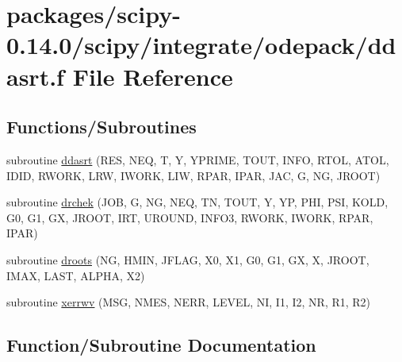 \hypertarget{ddasrt_8f}{}\section{packages/scipy-\/0.14.0/scipy/integrate/odepack/ddasrt.f File Reference}
\label{ddasrt_8f}
\subsection*{Functions/\+Subroutines}
\begin{DoxyCompactItemize}
\item 
subroutine \hyperlink{ddasrt_8f_adfc3346e603984f58f7cd11c3398bb07}{ddasrt} (R\+E\+S, N\+E\+Q, T, Y, Y\+P\+R\+I\+M\+E, T\+O\+U\+T, I\+N\+F\+O, R\+T\+O\+L, A\+T\+O\+L, I\+D\+I\+D, R\+W\+O\+R\+K, L\+R\+W, I\+W\+O\+R\+K, L\+I\+W, R\+P\+A\+R, I\+P\+A\+R, J\+A\+C, G, N\+G, J\+R\+O\+O\+T)
\item 
subroutine \hyperlink{ddasrt_8f_a4cde4bbacb0b416a894b59b0a293c7ea}{drchek} (J\+O\+B, G, N\+G, N\+E\+Q, T\+N, T\+O\+U\+T, Y, Y\+P, P\+H\+I, P\+S\+I, K\+O\+L\+D, G0, G1, G\+X, J\+R\+O\+O\+T, I\+R\+T, U\+R\+O\+U\+N\+D, I\+N\+F\+O3, R\+W\+O\+R\+K, I\+W\+O\+R\+K, R\+P\+A\+R, I\+P\+A\+R)
\item 
subroutine \hyperlink{ddasrt_8f_a143b7750ca413bfb317a54a34737d0df}{droots} (N\+G, H\+M\+I\+N, J\+F\+L\+A\+G, X0, X1, G0, G1, G\+X, X, J\+R\+O\+O\+T, I\+M\+A\+X, L\+A\+S\+T, A\+L\+P\+H\+A, X2)
\item 
subroutine \hyperlink{ddasrt_8f_a67021eb787c6039db5cee1a98e06b722}{xerrwv} (M\+S\+G, N\+M\+E\+S, N\+E\+R\+R, L\+E\+V\+E\+L, N\+I, I1, I2, N\+R, R1, R2)
\end{DoxyCompactItemize}


\subsection{Function/\+Subroutine Documentation}
\hypertarget{ddasrt_8f_adfc3346e603984f58f7cd11c3398bb07}{}
